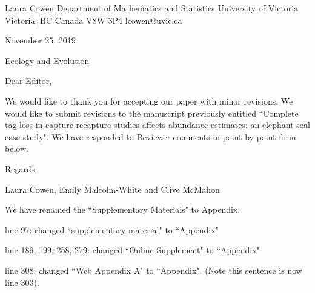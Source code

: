 \documentclass[12pt]{article}
\begin{document}
\noindent Laura Cowen \newline
\noindent Department of Mathematics and Statistics \newline
\noindent University of Victoria \newline
\noindent Victoria, BC \newline
\noindent Canada V8W 3P4 \newline
\noindent lcowen@uvic.ca \newline

\bigskip

\bigskip

\noindent \normalsize November 25, 2019
\bigskip





\noindent Ecology and Evolution


\bigskip


\bigskip
\noindent Dear Editor,

\bigskip

We would like to thank you for accepting our paper with minor revisions. We would like to submit revisions to the manuscript previously entitled ``Complete tag loss in capture-recapture studies affects abundance estimates: an elephant seal case study".  We have responded to Reviewer comments in point by point form below. 

\bigskip

Regards,

\bigskip


Laura Cowen, Emily Malcolm-White and Clive McMahon


\newpage

\bigskip



\noindent We have renamed the ``Supplementary Materials" to Appendix. 

line 97: changed ``supplementary material" to ``Appendix"

line 189, 199, 258, 279: changed ``Online Supplement" to ``Appendix"

line 308: changed ``Web Appendix A" to ``Appendix". (Note this sentence is now line 303).
 

\bigskip
\end{document}
